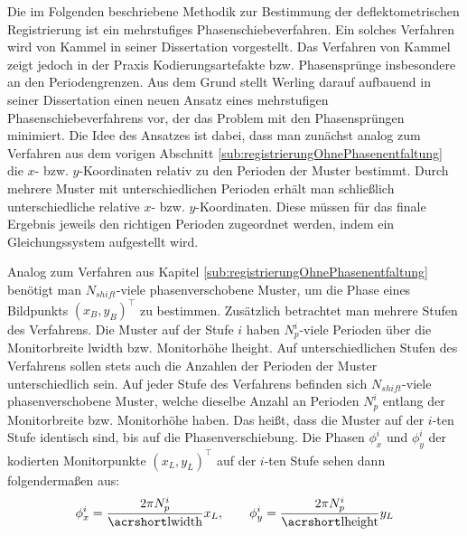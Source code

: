 Die im Folgenden beschriebene Methodik zur Bestimmung der deflektometrischen Registrierung ist ein mehrstufiges Phasenschiebeverfahren.
Ein solches Verfahren wird von Kammel in seiner Dissertation \cite{kit_kammel} vorgestellt.
Das Verfahren von Kammel zeigt jedoch in der Praxis Kodierungsartefakte bzw. Phasensprünge insbesondere an den Periodengrenzen.
Aus dem Grund stellt Werling darauf aufbauend in seiner Dissertation \cite{kit_werling} einen neuen Ansatz eines mehrstufigen Phasenschiebeverfahrens vor, der das Problem mit den Phasensprüngen minimiert.
Die Idee des Ansatzes ist dabei, dass man zunächst analog zum Verfahren aus dem vorigen Abschnitt \ref{sub:registrierungOhnePhasenentfaltung} die $x$- bzw. $y$-Koordinaten relativ zu den Perioden der Muster bestimmt.
Durch mehrere Muster mit unterschiedlichen Perioden erhält man schließlich unterschiedliche relative $x$- bzw. $y$-Koordinaten.
Diese müssen für das finale Ergebnis jeweils den richtigen Perioden zugeordnet werden, indem ein Gleichungssystem aufgestellt wird.

\p
Analog zum Verfahren aus Kapitel \ref{sub:registrierungOhnePhasenentfaltung} benötigt man $N_{shift}$-viele phasenverschobene Muster, um die Phase eines Bildpunkts $(x_B, y_B)^\top$ zu bestimmen.
Zusätzlich betrachtet man mehrere Stufen des Verfahrens.
Die Muster auf der Stufe $i$ haben $N_p^i$-viele Perioden über die Monitorbreite \acrshort{lwidth} bzw. Monitorhöhe \acrshort{lheight}.
Auf unterschiedlichen Stufen des Verfahrens sollen stets auch die Anzahlen der Perioden der Muster unterschiedlich sein.
Auf jeder Stufe des Verfahrens befinden sich $N_{shift}$-viele phasenverschobene Muster, welche dieselbe Anzahl an Perioden $N_p^i$ entlang der Monitorbreite bzw. Monitorhöhe haben.
Das heißt, dass die Muster auf der $i$-ten Stufe identisch sind, bis auf die Phasenverschiebung.
Die Phasen $\phi_x^i$ und $\phi_y^i$ der kodierten Monitorpunkte $(x_L, y_L)^\top$ auf der $i$-ten Stufe sehen dann folgendermaßen aus:
%
\begin{equation}
	\phi_x^i = \dfrac{2\pi N_p^i}{\acrshortmath{lwidth}} x_L,
	\qquad
	\phi_y^i = \dfrac{2\pi N_p^i}{\acrshortmath{lheight}} y_L
\end{equation}

